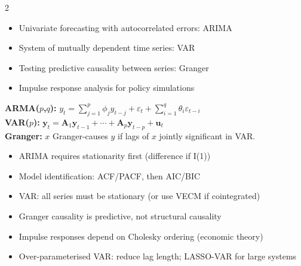 \documentclass[10pt,a4paper]{article}
\begin{document}
\begin{multicols}{2}

\begin{tcolorbox}[when]
\begin{itemize}
  \item Univariate forecasting with autocorrelated errors: ARIMA
  \item System of mutually dependent time series: VAR
  \item Testing predictive causality between series: Granger
  \item Impulse response analysis for policy simulations
\end{itemize}
\end{tcolorbox}

\begin{tcolorbox}[key]
\textbf{ARMA($p$,$q$):} $y_t = \sum_{j=1}^p \phi_j y_{t-j} + \varepsilon_t + \sum_{i=1}^q \theta_i \varepsilon_{t-i}$\\[4pt]
\textbf{VAR($p$):} $\mathbf{y}_t = \mathbf{A}_1\mathbf{y}_{t-1} + \cdots + \mathbf{A}_p\mathbf{y}_{t-p} + \mathbf{u}_t$\\[4pt]
\textbf{Granger:} $x$ Granger-causes $y$ if lags of $x$ jointly significant in VAR.
\end{tcolorbox}

\columnbreak

\begin{tcolorbox}[watchout]
\begin{itemize}
  \item ARIMA requires stationarity first (difference if I(1))
  \item Model identification: ACF/PACF, then AIC/BIC
  \item VAR: all series must be stationary (or use VECM if cointegrated)
  \item Granger causality is predictive, not structural causality
  \item Impulse responses depend on Cholesky ordering (economic theory)
  \item Over-parameterised VAR: reduce lag length; LASSO-VAR for large systems
\end{itemize}
\end{tcolorbox}

\end{multicols}
\end{document}
